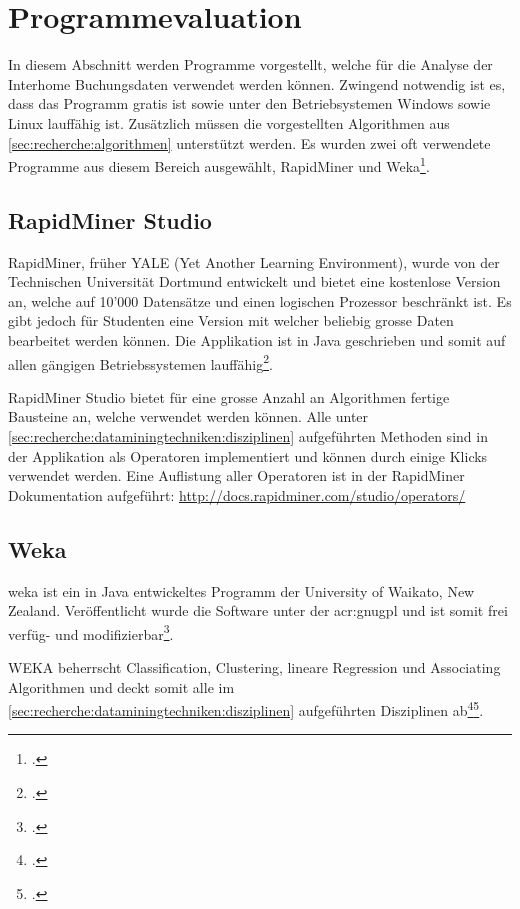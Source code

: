 \section{Programmevaluation}
\label{sec:recherche:programmevaluation}
In diesem Abschnitt werden Programme vorgestellt, welche für die Analyse der Interhome Buchungsdaten verwendet werden können. 
Zwingend notwendig ist es, dass das Programm gratis ist sowie unter den Betriebsystemen Windows sowie Linux lauffähig ist. Zusätzlich müssen die vorgestellten Algorithmen aus \cref{sec:recherche:algorithmen} unterstützt werden.
Es wurden zwei oft verwendete Programme aus diesem Bereich ausgewählt, RapidMiner und Weka\footcite{Six_of_the_Best_Open_Source_Data_Mining_Tools_-_The_New_Stack_2017-05-29}.



\subsection{RapidMiner Studio}
RapidMiner, früher YALE (Yet Another Learning Environment), wurde von der Technischen Universität Dortmund entwickelt und bietet eine kostenlose Version an, welche auf 10'000 Datensätze und einen logischen Prozessor beschränkt ist. Es gibt jedoch für Studenten eine Version mit welcher beliebig grosse Daten bearbeitet werden können. Die Applikation ist in Java geschrieben und somit auf allen gängigen Betriebssystemen lauffähig\footcite{RapidMiner_Studio_2017-01-14}.

RapidMiner Studio bietet für eine grosse Anzahl an Algorithmen fertige Bausteine an, welche verwendet werden können. Alle unter \cref{sec:recherche:dataminingtechniken:disziplinen} aufgeführten Methoden sind in der Applikation als Operatoren implementiert und können durch einige Klicks verwendet werden. Eine Auflistung aller Operatoren ist in der RapidMiner Dokumentation aufgeführt: \url{http://docs.rapidminer.com/studio/operators/}

\subsection{Weka}
\gls{weka} ist ein in Java entwickeltes Programm der University of Waikato, New Zealand. Veröffentlicht wurde die Software unter der \gls{acr:gnugpl} und ist somit frei verfüg- und modifizierbar\footcite{Weka_2017-01-14}.

WEKA beherrscht Classification, Clustering, lineare Regression und Associating Algorithmen und deckt somit alle  im \cref{sec:recherche:dataminingtechniken:disziplinen} aufgeführten Disziplinen ab\footcite{Weka_Doc_2017-01-14}\footcite{Weka_Regression_2017-01-14}.

